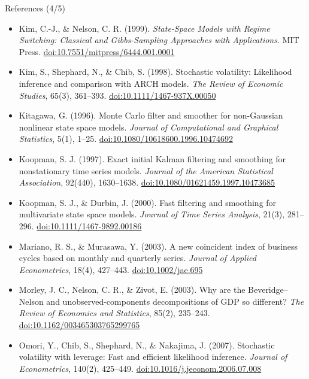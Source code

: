 \begin{frame}{References (4/5)}
\itemsize{\tiny}
\begin{itemize}
    \item Kim, C.-J., \& Nelson, C. R. (1999). \textit{State-Space Models with Regime Switching: Classical and Gibbs-Sampling Approaches with Applications}. MIT Press. \href{https://doi.org/10.7551/mitpress/6444.001.0001}{doi:10.7551/mitpress/6444.001.0001}
    \item Kim, S., Shephard, N., \& Chib, S. (1998). Stochastic volatility: Likelihood inference and comparison with ARCH models. \textit{The Review of Economic Studies}, 65(3), 361--393. \href{https://doi.org/10.1111/1467-937X.00050}{doi:10.1111/1467-937X.00050}
    \item Kitagawa, G. (1996). Monte Carlo filter and smoother for non-Gaussian nonlinear state space models. \textit{Journal of Computational and Graphical Statistics}, 5(1), 1--25. \href{https://doi.org/10.1080/10618600.1996.10474692}{doi:10.1080/10618600.1996.10474692}
    \item Koopman, S. J. (1997). Exact initial Kalman filtering and smoothing for nonstationary time series models. \textit{Journal of the American Statistical Association}, 92(440), 1630--1638. \href{https://doi.org/10.1080/01621459.1997.10473685}{doi:10.1080/01621459.1997.10473685}
    \item Koopman, S. J., \& Durbin, J. (2000). Fast filtering and smoothing for multivariate state space models. \textit{Journal of Time Series Analysis}, 21(3), 281--296. \href{https://doi.org/10.1111/1467-9892.00186}{doi:10.1111/1467-9892.00186}
    \item Mariano, R. S., \& Murasawa, Y. (2003). A new coincident index of business cycles based on monthly and quarterly series. \textit{Journal of Applied Econometrics}, 18(4), 427--443. \href{https://doi.org/10.1002/jae.695}{doi:10.1002/jae.695}
    \item Morley, J. C., Nelson, C. R., \& Zivot, E. (2003). Why are the Beveridge--Nelson and unobserved-components decompositions of GDP so different? \textit{The Review of Economics and Statistics}, 85(2), 235--243. \href{https://doi.org/10.1162/003465303765299765}{doi:10.1162/003465303765299765}
    \item Omori, Y., Chib, S., Shephard, N., \& Nakajima, J. (2007). Stochastic volatility with leverage: Fast and efficient likelihood inference. \textit{Journal of Econometrics}, 140(2), 425--449. \href{https://doi.org/10.1016/j.jeconom.2006.07.008}{doi:10.1016/j.jeconom.2006.07.008}

\end{itemize}
\end{frame}
